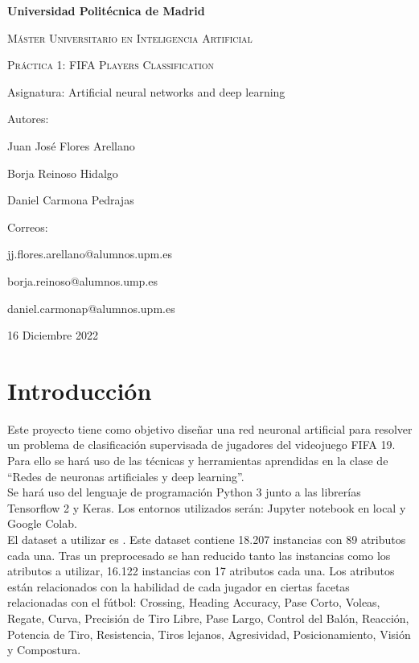 \documentclass{article}
\begin{document}

\begin{titlepage}
	\centering
	{\bfseries\LARGE Universidad Polit\'ecnica de Madrid \par}
	\vspace{1cm}
	{\scshape\Large M\'aster Universitario en Inteligencia Artificial \par}
	\vspace{3cm}
	{\scshape\Huge Pr\'actica 1: FIFA Players Classification \par}
	\vspace{3cm}
	{\Large Asignatura: Artificial neural networks and deep learning \par}
	\vfill
	{\Large Autores: \par}
	{\Large Juan José Flores Arellano \par
	 		Borja Reinoso Hidalgo \par 
	 		Daniel Carmona Pedrajas \par}
	\vfill
	{\Large Correos: \par}
	{\Large jj.flores.arellano@alumnos.upm.es \par
			borja.reinoso@alumnos.ump.es \par 
	 		daniel.carmonap@alumnos.upm.es \par}	
	\vfill
	{\Large 16 Diciembre 2022 \par}
\end{titlepage}

\tableofcontents
	\section{Introducci\'on}
	\label{intro}
		Este proyecto tiene como objetivo diseñar una red neuronal artificial para resolver un problema de clasificación supervisada de jugadores del videojuego FIFA 19. Para ello se hará uso de las técnicas y herramientas aprendidas en la clase de “Redes de neuronas artificiales y deep learning”.\\

	Se hará uso del lenguaje de programación Python 3 junto a las librerías Tensorflow 2 y Keras. Los entornos utilizados serán: Jupyter notebook en local y Google Colab.\\

	El dataset a utilizar es {}. Este dataset contiene 18.207 instancias con 89 atributos cada una. Tras un preprocesado se han reducido tanto las instancias como los atributos a utilizar, 16.122 instancias con 17 atributos cada una. Los atributos están relacionados con la habilidad de cada jugador en ciertas facetas relacionadas con el fútbol: Crossing, Heading Accuracy, Pase Corto, Voleas, Regate, Curva, Precisión de Tiro Libre, Pase Largo, Control del Balón, Reacción, Potencia de Tiro, Resistencia, Tiros lejanos, Agresividad, Posicionamiento, Visión y Compostura.\\
\end{document}
